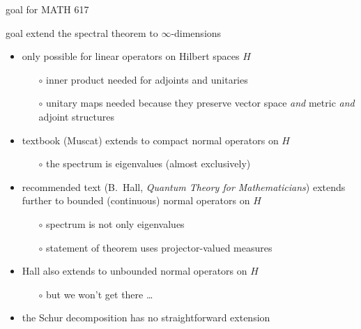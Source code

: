 \documentclass[10pt,hyperref]{beamer}
\begin{document}
\begin{frame}{goal for MATH 617}

\begin{block}{goal}
extend the spectral theorem to $\infty$-dimensions
\end{block}

\begin{itemize}
\item only possible for linear operators on Hilbert spaces $H$
    \begin{itemize}
    \item[$\circ$] inner product needed for adjoints and unitaries
    \item[$\circ$] unitary maps needed because they preserve vector space \emph{and} metric \emph{and} adjoint structures
    \end{itemize}
\item textbook (Muscat) extends to \alert{compact normal operators} on $H$
    \begin{itemize}
    \item[$\circ$] the spectrum is eigenvalues (almost exclusively)
    \end{itemize}
\item recommended text (B.~Hall, \emph{Quantum Theory for Mathematicians}) extends further to \alert{bounded (continuous) normal operators} on $H$
    \begin{itemize}
    \item[$\circ$] spectrum is not only eigenvalues
    \item[$\circ$] statement of theorem uses projector-valued measures
    \end{itemize}
\item Hall also extends to unbounded normal operators on $H$
    \begin{itemize}
    \item[$\circ$] but we won't get there \dots
    \end{itemize}
\item the Schur decomposition has no straightforward extension
\end{itemize}
\end{frame}


\end{document}
